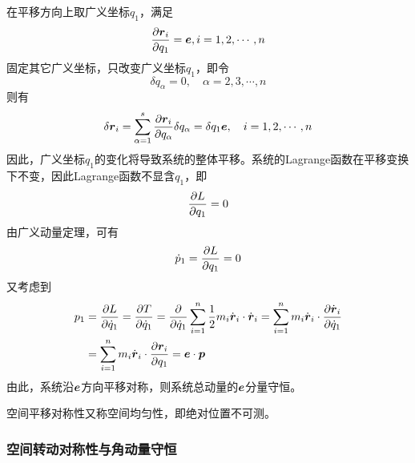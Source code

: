 在平移方向上取广义坐标$q_1$，满足
\begin{equation*}
	\frac{\partial \boldsymbol{r}_i}{\partial q_1} = \boldsymbol{e},i =1,2,\cdots,n
\end{equation*}
固定其它广义坐标，只改变广义坐标$q_1$，即令
\begin{equation*}
	\delta q_\alpha = 0 ,\quad \alpha = 2,3,\cdots,n
\end{equation*}
则有
\begin{equation*}
	\delta \boldsymbol{r}_i = \sum_{\alpha=1}^s \frac{\partial \boldsymbol{r}_i}{\partial q_\alpha} \delta q_\alpha = \delta q_1 \boldsymbol{e},\quad i = 1,2,\cdots,n
\end{equation*}
因此，广义坐标$q_1$的变化将导致系统的整体平移。系统的Lagrange函数在平移变换下不变，因此Lagrange函数不显含$q_1$，即
\begin{equation*}
	\frac{\partial L}{\partial q_1} = 0
\end{equation*}
由广义动量定理，可有
\begin{equation*}
	\dot{p}_1 = \frac{\partial L}{\partial q_1} = 0
\end{equation*}
又考虑到
\begin{align*}
	p_1 & = \frac{\partial L}{\partial \dot{q}_1} = \frac{\partial T}{\partial \dot{q}_1} = \frac{\partial}{\partial \dot{q}_1} \sum_{i=1}^n \frac12 m_i \dot{\boldsymbol{r}}_i \cdot \dot{\boldsymbol{r}}_i = \sum_{i=1}^n m_i \dot{\boldsymbol{r}}_i \cdot \frac{\partial \dot{\boldsymbol{r}}_i}{\partial \dot{q}_1} \\
	& = \sum_{i=1}^n m_i \dot{\boldsymbol{r}}_i \cdot \frac{\partial \boldsymbol{r}_i}{\partial q_1} = \boldsymbol{e} \cdot \boldsymbol{p}
\end{align*}
由此，系统沿$\boldsymbol{e}$方向平移对称，则系统总动量的$\boldsymbol{e}$分量守恒。

空间平移对称性又称{\heiti 空间均匀性}，即绝对位置不可测。

\subsubsection{空间转动对称性与角动量守恒}


